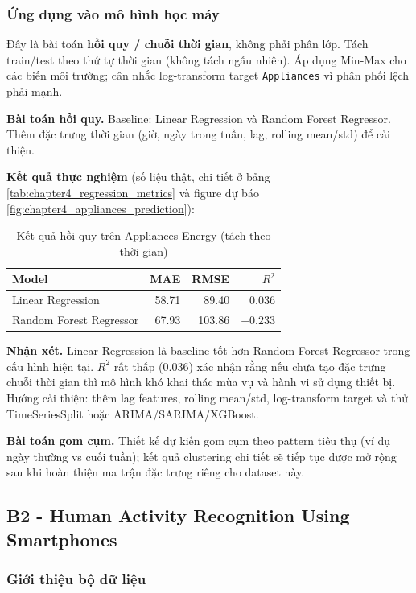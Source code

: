 \subsubsection{Ứng dụng vào mô hình học máy}

Đây là bài toán \textbf{hồi quy / chuỗi thời gian}, không phải phân lớp. Tách train/test theo thứ tự thời gian (không tách ngẫu nhiên). Áp dụng Min-Max cho các biến môi trường; cân nhắc log-transform target \texttt{Appliances} vì phân phối lệch phải mạnh.

\textbf{Bài toán hồi quy.} Baseline: Linear Regression và Random Forest Regressor. Thêm đặc trưng thời gian (giờ, ngày trong tuần, lag, rolling mean/std) để cải thiện.

\textbf{Kết quả thực nghiệm} (số liệu thật, chi tiết ở bảng \ref{tab:chapter4_regression_metrics} và figure dự báo \ref{fig:chapter4_appliances_prediction}):

\begin{table}[H]
\centering
\caption{Kết quả hồi quy trên Appliances Energy (tách theo thời gian)}
\label{tab:appliances_ml_results}
\small
\begin{tabular}{lrrr}
\toprule
Model & MAE & RMSE & $R^2$ \\
\midrule
Linear Regression & 58.71 & 89.40 & 0.036 \\
Random Forest Regressor & 67.93 & 103.86 & $-0.233$ \\
\bottomrule
\end{tabular}
\end{table}

\textbf{Nhận xét.} Linear Regression là baseline tốt hơn Random Forest Regressor trong cấu hình hiện tại. $R^2$ rất thấp (0.036) xác nhận rằng nếu chưa tạo đặc trưng chuỗi thời gian thì mô hình khó khai thác mùa vụ và hành vi sử dụng thiết bị. Hướng cải thiện: thêm lag features, rolling mean/std, log-transform target và thử TimeSeriesSplit hoặc ARIMA/SARIMA/XGBoost.

\textbf{Bài toán gom cụm.} Thiết kế dự kiến gom cụm theo pattern tiêu thụ (ví dụ ngày thường vs cuối tuần); kết quả clustering chi tiết sẽ tiếp tục được mở rộng sau khi hoàn thiện ma trận đặc trưng riêng cho dataset này.

\subsection{B2 - Human Activity Recognition Using Smartphones}

\subsubsection{Giới thiệu bộ dữ liệu}

